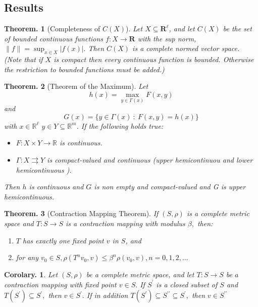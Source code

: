\documentclass{article}
\newtheorem{teo}{Theorem. }
\newtheorem{coro}{Corolary. }
\theoremstyle{definition}
\begin{document}
\subsection{Results}
\begin{teo}[Completeness of $C(X)$]
Let $X \subseteq \mathbf{R}^{\ell}$, and let $C(X)$ be the set of bounded continuous functions $f: X \rightarrow \mathbf{R}$ with the sup norm, $\|f\|=\sup _{x \in X}|f(x)| .$ Then $C(X)$ is a complete normed vector space. (Note that if $X$ is compact then every continuous function is bounded. Otherwise the restriction to bounded functions must be added.)
\end{teo}

\begin{teo}[Theorem of the Maximum]
Let $$h(x)=\max_{y\in \Gamma(x)}F(x, y)$$ and $$G(x)=\{y\in\Gamma(x)\::\:F(x,y)=h(x)\}$$
with $x\in \mathbb{R}^\ell$ $y\in Y\subseteq\mathbb{R}^m$. If the following holds true:
\begin{itemize}
    \item $F:X\times Y\to \mathbb{R}$ is continuous.
    \item $\Gamma:X \rightrightarrows Y$ is compact-valued and continuous (upper
 hemicontinuou and lower hemicontinuous ).
\end{itemize}

Then $h$ is continuous and $G$ is non empty and compact-valued and G is upper hemicontinuous.
\end{teo}

\begin{teo}[Contraction Mapping Theorem]
If  $(S, \rho)$  is a complete metric  space and $T: S \rightarrow S$ is a contraction mapping with modulus $\beta,$ then:
\begin{enumerate}
    \item $T$ has exactly one fixed point $v$ in $S$, and
    \item for any $v_{0} \in S, \rho\left(T^{n} v_{0}, v\right) \leq \beta^{n} \rho\left(v_{0}, v\right), n=0,1,2, \ldots$
\end{enumerate}
\end{teo}

\begin{coro}
Let $(S, \rho)$ be a complete metric space, and let $T: S \rightarrow S$ be $a$ contraction mapping with fixed point $v \in S .$ If $S^{\prime}$ is a closed subset of $S$ and $T\left(S^{\prime}\right) \subseteq S^{\prime},$ then $v \in S^{\prime} .$ If in addition $T\left(S^{\prime}\right) \subseteq S^{\prime \prime} \subseteq S^{\prime},$ then $v \in S^{\prime \prime}$

\end{coro}
\end{document}
